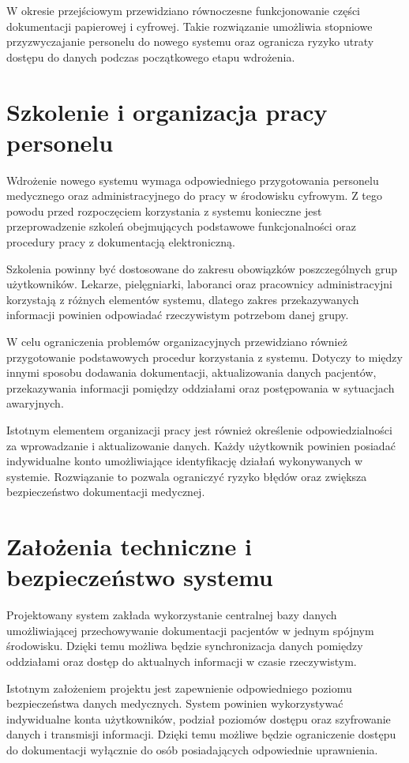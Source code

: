W okresie przejściowym przewidziano równoczesne funkcjonowanie części dokumentacji papierowej i cyfrowej. Takie rozwiązanie umożliwia stopniowe przyzwyczajanie personelu do nowego systemu oraz ogranicza ryzyko utraty dostępu do danych podczas początkowego etapu wdrożenia.

\section{Szkolenie i organizacja pracy personelu}

Wdrożenie nowego systemu wymaga odpowiedniego przygotowania personelu medycznego oraz administracyjnego do pracy w środowisku cyfrowym. Z tego powodu przed rozpoczęciem korzystania z systemu konieczne jest przeprowadzenie szkoleń obejmujących podstawowe funkcjonalności oraz procedury pracy z dokumentacją elektroniczną.

Szkolenia powinny być dostosowane do zakresu obowiązków poszczególnych grup użytkowników. Lekarze, pielęgniarki, laboranci oraz pracownicy administracyjni korzystają z różnych elementów systemu, dlatego zakres przekazywanych informacji powinien odpowiadać rzeczywistym potrzebom danej grupy.

W celu ograniczenia problemów organizacyjnych przewidziano również przygotowanie podstawowych procedur korzystania z systemu. Dotyczy to między innymi sposobu dodawania dokumentacji, aktualizowania danych pacjentów, przekazywania informacji pomiędzy oddziałami oraz postępowania w sytuacjach awaryjnych.

Istotnym elementem organizacji pracy jest również określenie odpowiedzialności za wprowadzanie i aktualizowanie danych. Każdy użytkownik powinien posiadać indywidualne konto umożliwiające identyfikację działań wykonywanych w systemie. Rozwiązanie to pozwala ograniczyć ryzyko błędów oraz zwiększa bezpieczeństwo dokumentacji medycznej.

\section{Założenia techniczne i bezpieczeństwo systemu}

Projektowany system zakłada wykorzystanie centralnej bazy danych umożliwiającej przechowywanie dokumentacji pacjentów w jednym spójnym środowisku. Dzięki temu możliwa będzie synchronizacja danych pomiędzy oddziałami oraz dostęp do aktualnych informacji w czasie rzeczywistym.

Istotnym założeniem projektu jest zapewnienie odpowiedniego poziomu bezpieczeństwa danych medycznych. System powinien wykorzystywać indywidualne konta użytkowników, podział poziomów dostępu oraz szyfrowanie danych i transmisji informacji. Dzięki temu możliwe będzie ograniczenie dostępu do dokumentacji wyłącznie do osób posiadających odpowiednie uprawnienia.

